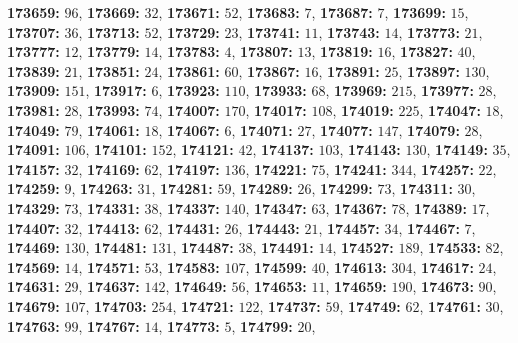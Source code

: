 \textsf{\bfseries 173659:} $96$, \textsf{\bfseries 173669:} $32$, \textsf{\bfseries 173671:} $52$, \textsf{\bfseries 173683:} $7$, \textsf{\bfseries 173687:} $7$, \textsf{\bfseries 173699:} $15$, \textsf{\bfseries 173707:} $36$, \textsf{\bfseries 173713:} $52$, \textsf{\bfseries 173729:} $23$, \textsf{\bfseries 173741:} $11$, \textsf{\bfseries 173743:} $14$, \textsf{\bfseries 173773:} $21$, \textsf{\bfseries 173777:} $12$, \textsf{\bfseries 173779:} $14$, \textsf{\bfseries 173783:} $4$, \textsf{\bfseries 173807:} $13$, \textsf{\bfseries 173819:} $16$, \textsf{\bfseries 173827:} $40$, \textsf{\bfseries 173839:} $21$, \textsf{\bfseries 173851:} $24$, \textsf{\bfseries 173861:} $60$, \textsf{\bfseries 173867:} $16$, \textsf{\bfseries 173891:} $25$, \textsf{\bfseries 173897:} $130$, \textsf{\bfseries 173909:} $151$, \textsf{\bfseries 173917:} $6$, \textsf{\bfseries 173923:} $110$, \textsf{\bfseries 173933:} $68$, \textsf{\bfseries 173969:} $215$, \textsf{\bfseries 173977:} $28$, \textsf{\bfseries 173981:} $28$, \textsf{\bfseries 173993:} $74$, \textsf{\bfseries 174007:} $170$, \textsf{\bfseries 174017:} $108$, \textsf{\bfseries 174019:} $225$, \textsf{\bfseries 174047:} $18$, \textsf{\bfseries 174049:} $79$, \textsf{\bfseries 174061:} $18$, \textsf{\bfseries 174067:} $6$, \textsf{\bfseries 174071:} $27$, \textsf{\bfseries 174077:} $147$, \textsf{\bfseries 174079:} $28$, \textsf{\bfseries 174091:} $106$, \textsf{\bfseries 174101:} $152$, \textsf{\bfseries 174121:} $42$, \textsf{\bfseries 174137:} $103$, \textsf{\bfseries 174143:} $130$, \textsf{\bfseries 174149:} $35$, \textsf{\bfseries 174157:} $32$, \textsf{\bfseries 174169:} $62$, \textsf{\bfseries 174197:} $136$, \textsf{\bfseries 174221:} $75$, \textsf{\bfseries 174241:} $344$, \textsf{\bfseries 174257:} $22$, \textsf{\bfseries 174259:} $9$, \textsf{\bfseries 174263:} $31$, \textsf{\bfseries 174281:} $59$, \textsf{\bfseries 174289:} $26$, \textsf{\bfseries 174299:} $73$, \textsf{\bfseries 174311:} $30$, \textsf{\bfseries 174329:} $73$, \textsf{\bfseries 174331:} $38$, \textsf{\bfseries 174337:} $140$, \textsf{\bfseries 174347:} $63$, \textsf{\bfseries 174367:} $78$, \textsf{\bfseries 174389:} $17$, \textsf{\bfseries 174407:} $32$, \textsf{\bfseries 174413:} $62$, \textsf{\bfseries 174431:} $26$, \textsf{\bfseries 174443:} $21$, \textsf{\bfseries 174457:} $34$, \textsf{\bfseries 174467:} $7$, \textsf{\bfseries 174469:} $130$, \textsf{\bfseries 174481:} $131$, \textsf{\bfseries 174487:} $38$, \textsf{\bfseries 174491:} $14$, \textsf{\bfseries 174527:} $189$, \textsf{\bfseries 174533:} $82$, \textsf{\bfseries 174569:} $14$, \textsf{\bfseries 174571:} $53$, \textsf{\bfseries 174583:} $107$, \textsf{\bfseries 174599:} $40$, \textsf{\bfseries 174613:} $304$, \textsf{\bfseries 174617:} $24$, \textsf{\bfseries 174631:} $29$, \textsf{\bfseries 174637:} $142$, \textsf{\bfseries 174649:} $56$, \textsf{\bfseries 174653:} $11$, \textsf{\bfseries 174659:} $190$, \textsf{\bfseries 174673:} $90$, \textsf{\bfseries 174679:} $107$, \textsf{\bfseries 174703:} $254$, \textsf{\bfseries 174721:} $122$, \textsf{\bfseries 174737:} $59$, \textsf{\bfseries 174749:} $62$, \textsf{\bfseries 174761:} $30$, \textsf{\bfseries 174763:} $99$, \textsf{\bfseries 174767:} $14$, \textsf{\bfseries 174773:} $5$, \textsf{\bfseries 174799:} $20$, 

